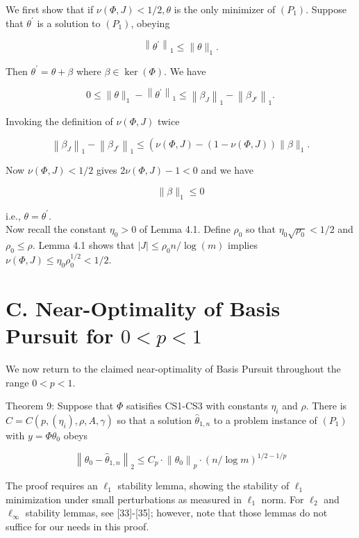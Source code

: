 \documentclass[10pt]{article}
\begin{document}
We first show that if $\nu(\Phi, J)<1 / 2, \theta$ is the only minimizer of $\left(P_{1}\right)$. Suppose that $\theta^{\prime}$ is a solution to $\left(P_{1}\right)$, obeying

$$
\left\|\theta^{\prime}\right\|_{1} \leq\|\theta\|_{1} .
$$

Then $\theta^{\prime}=\theta+\beta$ where $\beta \in \operatorname{ker}(\Phi)$. We have

$$
0 \leq\|\theta\|_{1}-\left\|\theta^{\prime}\right\|_{1} \leq\left\|\beta_{J}\right\|_{1}-\left\|\beta_{J^{c}}\right\|_{1} .
$$

Invoking the definition of $\nu(\Phi, J)$ twice

$$
\left\|\beta_{J}\right\|_{1}-\left\|\beta_{J^{c}}\right\|_{1} \leq\left(\nu(\Phi, J)-(1-\nu(\Phi, J))\|\beta\|_{1} .\right.
$$

Now $\nu(\Phi, J)<1 / 2$ gives $2 \nu(\Phi, J)-1<0$ and we have

$$
\|\beta\|_{1} \leq 0
$$

i.e., $\theta=\theta^{\prime}$.\\
Now recall the constant $\eta_{0}>0$ of Lemma 4.1. Define $\rho_{0}$ so that $\eta_{0} \sqrt{\rho_{0}}<1 / 2$ and $\rho_{0} \leq \rho$. Lemma 4.1 shows that $|J| \leq \rho_{0} n / \log (m)$ implies $\nu(\Phi, J) \leq \eta_{0} \rho_{0}^{1 / 2}<1 / 2$.

\section*{C. Near-Optimality of Basis Pursuit for $0<p<1$}
We now return to the claimed near-optimality of Basis Pursuit throughout the range $0<p<1$.

Theorem 9: Suppose that $\Phi$ satisifies CS1-CS3 with constants $\eta_{i}$ and $\rho$. There is $C=C\left(p,\left(\eta_{i}\right), \rho, A, \gamma\right)$ so that a solution $\hat{\theta}_{1, n}$ to a problem instance of $\left(P_{1}\right)$ with $y=\Phi \theta_{0}$ obeys

$$
\left\|\theta_{0}-\hat{\theta}_{1, n}\right\|_{2} \leq C_{p} \cdot\left\|\theta_{0}\right\|_{p} \cdot(n / \log m)^{1 / 2-1 / p}
$$

The proof requires an $\ell_{1}$ stability lemma, showing the stability of $\ell_{1}$ minimization under small perturbations as measured in $\ell_{1}$ norm. For $\ell_{2}$ and $\ell_{\infty}$ stability lemmas, see [33]-[35]; however, note that those lemmas do not suffice for our needs in this proof.
\end{document}
